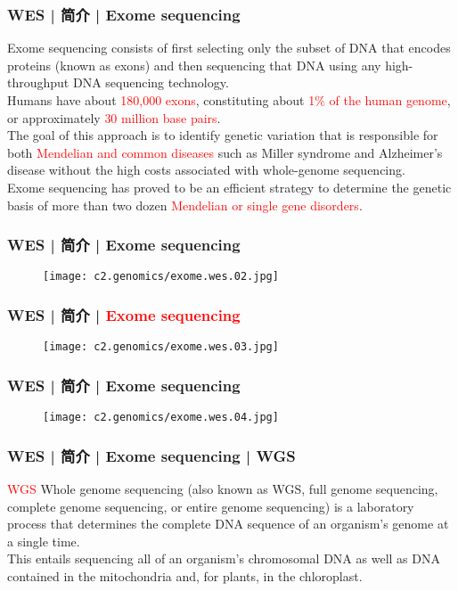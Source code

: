 \begin{frame}
  \frametitle{WES | 简介 | Exome sequencing}
  Exome sequencing consists of first selecting only the subset of DNA that encodes proteins (known as exons) and then sequencing that DNA using any high-throughput DNA sequencing technology.\\
  \vspace{1em}
  Humans have about \textcolor{red}{180,000 exons}, constituting about \textcolor{red}{1\% of the human genome}, or approximately \textcolor{red}{30 million base pairs}.\\
  \vspace{1em}
  The goal of this approach is to identify genetic variation that is responsible for both \textcolor{red}{Mendelian and common diseases} such as Miller syndrome and Alzheimer's disease without the high costs associated with whole-genome sequencing.\\
  \vspace{1em}
  Exome sequencing has proved to be an efficient strategy to determine the genetic basis of more than two dozen \textcolor{red}{Mendelian or single gene disorders}.
\end{frame}

\begin{frame}
  \frametitle{WES | 简介 | Exome sequencing}
  \begin{figure}
    \centering
    \texttt{[image: c2.genomics/exome.wes.02.jpg]}
  \end{figure}
\end{frame}

\begin{frame}
  \frametitle{WES | 简介 | \textcolor{red}{Exome sequencing}}
  \begin{figure}
    \centering
    \texttt{[image: c2.genomics/exome.wes.03.jpg]}
  \end{figure}
\end{frame}

\begin{frame}
  \frametitle{WES | 简介 | Exome sequencing}
  \begin{figure}
    \centering
    \texttt{[image: c2.genomics/exome.wes.04.jpg]}
  \end{figure}
\end{frame}

\begin{frame}
  \frametitle{WES | 简介 | Exome sequencing | WGS}
  \begin{block}{\textcolor{red}{WGS}}
    Whole genome sequencing (also known as WGS, full genome sequencing, complete genome sequencing, or entire genome sequencing) is a laboratory process that determines the complete DNA sequence of an organism's genome at a single time.\\
    \vspace{1em}
    This entails sequencing all of an organism's chromosomal DNA as well as DNA contained in the mitochondria and, for plants, in the chloroplast.
  \end{block}
\end{frame}

